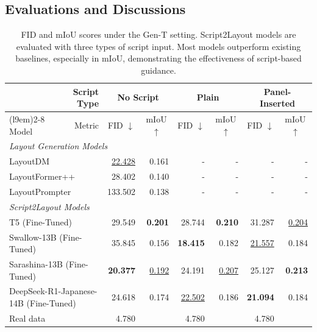 \subsection{Evaluations and Discussions}
\begin{table}[t]
\renewcommand{\arraystretch}{1.0}
\caption{
FID and mIoU scores under the Gen-T setting. Script2Layout models are evaluated with three types of script input. Most models outperform existing baselines, especially in mIoU, demonstrating the effectiveness of script-based guidance.
}
\vspace{-1.0em}
\centering
\label{tab:results}
\begin{tabular}{llrrrrrr}
\toprule
&\multicolumn{1}{r}{Script Type} & \multicolumn{2}{c}{No Script} & \multicolumn{2}{c}{Plain} & \multicolumn{2}{c}{Panel-Inserted} \\
\cmidrule(l{9em}){2-8}
Model & \multicolumn{1}{r}{Metric} 
 & \multicolumn{1}{c}{FID $\downarrow$} 
 & \multicolumn{1}{c}{mIoU $\uparrow$}
 & \multicolumn{1}{c}{FID $\downarrow$}
 & \multicolumn{1}{c}{mIoU $\uparrow$}
 & \multicolumn{1}{c}{FID $\downarrow$}
 & \multicolumn{1}{c}{mIoU $\uparrow$} \\
\midrule
\multicolumn{7}{l}{\it Layout Generation Models} \\%
\multicolumn{2}{l}{\hspace{0.5em}LayoutDM} & \underline{22.428} & 0.161 & - & - & - & - \\
\multicolumn{2}{l}{\hspace{0.5em}LayoutFormer++} & 28.402 & 0.140 & - & - & - & - \\
\multicolumn{2}{l}{\hspace{0.5em}LayoutPrompter} & 133.502 & 0.138 & - & - & - & - \\
\midrule[0.01em]
\multicolumn{7}{l}{\it Script2Layout Models} \\%
\multicolumn{2}{l}{\hspace{0.5em}T5 (Fine-Tuned)} & 29.549 & \textbf{0.201} & 28.744 & \textbf{0.210} & 31.287 & \underline{0.204} \\
\multicolumn{2}{l}{\hspace{0.5em}Swallow-13B (Fine-Tuned)} & 35.845 & 0.156 & \textbf{18.415} & 0.182 & \underline{21.557} & 0.184 \\
\multicolumn{2}{l}{\hspace{0.5em}Sarashina-13B (Fine-Tuned)} & \textbf{20.377} & \underline{0.192} & 24.191 & \underline{0.207} & 25.127 & \textbf{0.213} \\
\multicolumn{2}{l}{\hspace{0.5em}DeepSeek-R1-Japanese-14B (Fine-Tuned)} & 24.618 & 0.174 & \underline{22.502} & 0.186 & \textbf{21.094} & 0.184 \\
\midrule[0.01em]
\multicolumn{2}{l}{Real data} & 4.780 & & 4.780 & & 4.780 & \\
\bottomrule
\end{tabular}
\end{table}



